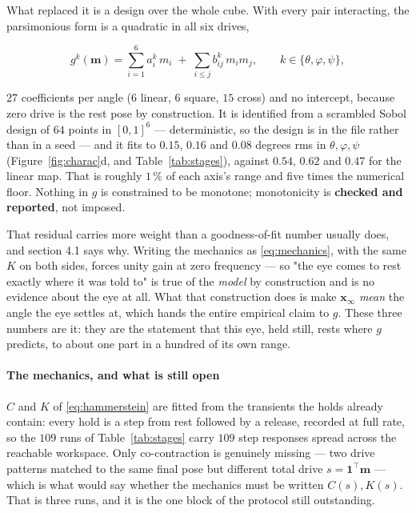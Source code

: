 \documentclass[10pt]{article}
\begin{document}
What replaced it is a design over the whole cube. With every pair interacting, the
parsimonious form is a quadratic in all six drives,

\begin{equation}
g^{k}(\mathbf{m})=\sum_{i=1}^{6} a^{k}_{i}\,m_i
\;+\;\sum_{i\le j} b^{k}_{ij}\,m_i m_j ,
\qquad k\in\{\theta,\varphi,\psi\},
\label{eq:quadratic}
\end{equation}

$27$ coefficients per angle ($6$ linear, $6$ square, $15$ cross) and no intercept, because
zero drive is the rest pose by construction. It is identified from a scrambled Sobol design
of $64$ points in $[0,1]^6$ --- deterministic, so the design is in the file rather than in a
seed --- and it fits to $0.15$, $0.16$ and $0.08$ degrees rms in $\theta,\varphi,\psi$
(Figure~\ref{fig:charac}d, and Table~\ref{tab:stages}), against $0.54$, $0.62$ and $0.47$
for the linear map. That is roughly $1\,\%$ of each axis's range and five times the
numerical floor. Nothing in $g$ is constrained to be monotone; monotonicity is
\textbf{checked and reported}, not imposed.

That residual carries more weight than a goodness-of-fit number usually does, and section
4.1 says why. Writing the mechanics as \eqref{eq:mechanics}, with the same $K$ on both
sides, forces unity gain at zero frequency --- so "the eye comes to rest exactly where it
was told to" is true of the \emph{model} by construction and is no evidence about the eye at
all. What that construction does is make $\mathbf{x}_\infty$ \emph{mean} the angle the eye
settles at, which hands the entire empirical claim to $g$. These three numbers are it: they
are the statement that this eye, held still, rests where $g$ predicts, to about one part in
a hundred of its own range.

\paragraph{The mechanics, and what is still open}

$C$ and $K$ of \eqref{eq:hammerstein} are fitted from the transients the holds already
contain: every hold is a step from rest followed by a release, recorded at full rate, so the
$109$ runs of Table~\ref{tab:stages} carry $109$ step responses spread across the reachable
workspace. Only co-contraction is genuinely missing --- two drive patterns matched to the
same final pose but different total drive $s=\mathbf{1}^{\!\top}\mathbf{m}$ --- which is
what would say whether the mechanics must be written $C(s),K(s)$. That is three runs, and it
is the one block of the protocol still outstanding.
\end{document}
